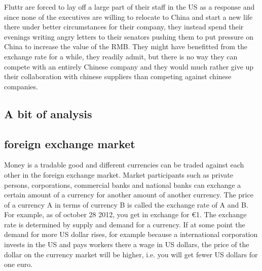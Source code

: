 \documentclass[11pt]{article}
\begin{document}
Fluttr are forced to lay off a large part of their staff in the US as a 
response and since none of the executives are willing to relocate to 
China and start a new life there under better circumstances for their 
company, they instead spend their evenings writing angry letters to 
their senators pushing them to put pressure on China to increase the 
value of the RMB. They might have benefitted from the exchange rate for 
a while, they readily admit, but there is no way they can compete with 
an entirely Chinese company and they would much rather give up their 
collaboration with chinese suppliers than competing against chinese 
companies.

\subsection{A bit of analysis}


\subsection{foreign exchange market}

Money is a tradable good and different currencies can be traded against each other in the foreign exchange market. Market participants such as private persons, corporations, commercial banks and national banks can exchange a certain amount of a currency for another amount of another currency. The price of a currency A in terms of currency B is called the exchange rate of A and B. For example, as of october 28 2012, you get  in exchange for \euro{1}. The exchange rate is determined by supply and demand for a currency. If at some point the demand for more US dollar rises, for example because a international corporation invests in the US and pays workers there a wage in US dollars, the price of the dollar on the currency market will be higher, i.e. you will get fewer US dollars for one euro.
\end{document}
